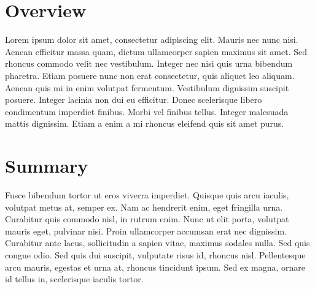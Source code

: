 \section{Overview}
   Lorem ipsum dolor sit amet, consectetur adipiscing elit. Mauris nec nunc nisi. Aenean efficitur massa quam, dictum ullamcorper sapien maximus sit amet. Sed rhoncus commodo velit nec vestibulum. Integer nec nisi quis urna bibendum pharetra. Etiam posuere nunc non erat consectetur, quis aliquet leo aliquam. Aenean quis mi in enim volutpat fermentum. Vestibulum dignissim suscipit posuere. Integer lacinia non dui eu efficitur. Donec scelerisque libero condimentum imperdiet finibus. Morbi vel finibus tellus. Integer malesuada mattis dignissim. Etiam a enim a mi rhoncus eleifend quis sit amet purus.

        
\section{Summary}
  Fusce bibendum tortor ut eros viverra imperdiet. Quisque quis arcu iaculis, volutpat metus at, semper ex. Nam ac hendrerit enim, eget fringilla urna. Curabitur quis commodo nisl, in rutrum enim. Nunc ut elit porta, volutpat mauris eget, pulvinar nisi. Proin ullamcorper accumsan erat nec dignissim. Curabitur ante lacus, sollicitudin a sapien vitae, maximus sodales nulla. Sed quis congue odio. Sed quis dui suscipit, vulputate risus id, rhoncus nisl. Pellentesque arcu mauris, egestas et urna at, rhoncus tincidunt ipsum. Sed ex magna, ornare id tellus in, scelerisque iaculis tortor.